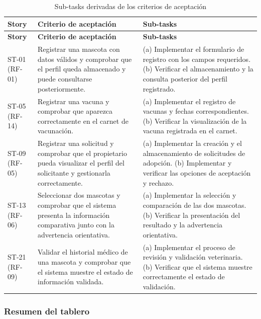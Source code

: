 \documentclass[journal,onecolumn]{IEEEtran}
\begin{document}
	\begin{longtable}{L{1.5cm} L{4.9cm} L{6.8cm}}
		\caption{Sub-tasks derivadas de los criterios de aceptación}
		\label{tab:subtasks}\\
		\toprule
		\textbf{Story} & \textbf{Criterio de aceptación} & \textbf{Sub-tasks} \\
		\midrule
		\endfirsthead
		\toprule
		\textbf{Story} & \textbf{Criterio de aceptación} & \textbf{Sub-tasks} \\
		\midrule
		\endhead
		\bottomrule
		\endfoot
		ST-01 \newline (RF-01) &
		Registrar una mascota con datos válidos y comprobar que el perfil queda almacenado y puede
		consultarse posteriormente. &
		(a) Implementar el formulario de registro con los campos requeridos.
		(b) Verificar el almacenamiento y la consulta posterior del perfil registrado. \\
		\addlinespace
		ST-05 \newline (RF-14) &
		Registrar una vacuna y comprobar que aparezca correctamente en el carnet de vacunación. &
		(a) Implementar el registro de vacunas y fechas correspondientes.
		(b) Verificar la visualización de la vacuna registrada en el carnet. \\
		\addlinespace
		ST-09 \newline (RF-05) &
		Registrar una solicitud y comprobar que el propietario pueda visualizar el perfil del
		solicitante y gestionarla correctamente. &
		(a) Implementar la creación y el almacenamiento de solicitudes de adopción.
		(b) Implementar y verificar las opciones de aceptación y rechazo. \\
		\addlinespace
		ST-13 \newline (RF-06) &
		Seleccionar dos mascotas y comprobar que el sistema presenta la información comparativa junto
		con la advertencia orientativa. &
		(a) Implementar la selección y comparación de las dos mascotas.
		(b) Verificar la presentación del resultado y la advertencia orientativa. \\
		\addlinespace
		ST-21 \newline (RF-09) &
		Validar el historial médico de una mascota y comprobar que el sistema muestre el estado de
		información validada. &
		(a) Implementar el proceso de revisión y validación veterinaria.
		(b) Verificar que el sistema muestre correctamente el estado de validación. \\
	\end{longtable}
	
	\subsubsection{Resumen del tablero}
	
\end{document}
